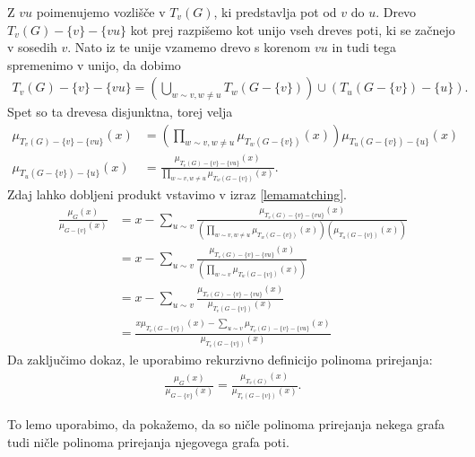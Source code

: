 \begin{dokaz}
    Z \(vu\) poimenujemo vozlišče v \(T_v(G)\), ki predstavlja pot od \(v\) do \(u\). Drevo \(T_v(G) - \{v\} - \{vu\}\) kot prej razpišemo kot unijo vseh dreves poti, ki se začnejo v sosedih \(v\). Nato iz te unije vzamemo drevo s korenom \(vu\) in tudi tega spremenimo v unijo, da dobimo
    \begin{align*}
        T_v(G) - \{v\} - \{vu\} = \left(\bigcup_{w\sim v, w\neq u} T_w(G-\{v\})\right) \cup (T_u(G-\{v\}) - \{u\}).
    \end{align*}
    Spet so ta drevesa disjunktna, torej velja
    \begin{align*}
        \mu_{T_v(G) - \{v\} - \{vu\}}(x) &= \left(\prod_{w\sim v, w\neq u} \mu_{T_w(G-\{v\})}(x)\right) \mu_{T_u(G-\{v\}) - \{u\}}(x) \\
        \mu_{T_u(G-\{v\}) - \{u\}}(x) &= \frac{\mu_{T_v(G) - \{v\} - \{vu\}}(x)}{\prod_{w\sim v, w\neq u} \mu_{T_w(G-\{v\})}(x)}.
    \end{align*}
    Zdaj lahko dobljeni produkt vstavimo v izraz \ref{lemamatching}.
    \begin{align*}
        \frac{\mu_G(x)}{\mu_{G-\{v\}}(x)} & =x - \sum_{u\sim v}\frac{\mu_{T_v(G) - \{v\} - \{vu\}}(x)}{(\prod_{w\sim v, w\neq u} \mu_{T_w(G-\{v\})}(x))(\mu_{T_u(G-\{v\})}(x))} \\
                                          & = x - \sum_{u\sim v}\frac{\mu_{T_v(G) - \{v\} - \{vu\}}(x)}{(\prod_{w\sim v} \mu_{T_w(G-\{v\})}(x))}                                \\
                                          & = x - \sum_{u\sim v}\frac{\mu_{T_v(G) - \{v\} - \{vu\}}(x)}{\mu_{T_v(G-\{v\})}(x)}                                                  \\
                                          & = \frac{x \mu_{T_v(G-\{v\})}(x) - \sum_{u\sim v} \mu_{T_v(G) - \{v\} - \{vu\}}(x)}{\mu_{T_v(G-\{v\})}(x)}
    \end{align*}
    Da zaključimo dokaz, le uporabimo rekurzivno definicijo polinoma prirejanja:
    \begin{align*}
        \frac{\mu_G(x)}{\mu_{G-\{v\}}(x)} = \frac{\mu_{T_v(G)}(x)}{\mu_{T_v(G-\{v\})}(x)}.
    \end{align*}
\end{dokaz}

To lemo uporabimo, da pokažemo, da so ničle polinoma prirejanja nekega grafa tudi ničle polinoma prirejanja njegovega grafa poti.

